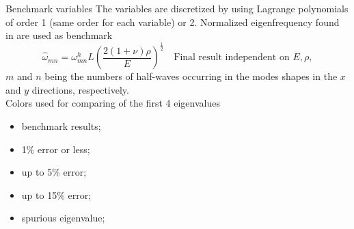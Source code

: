\documentclass{beamer}
\begin{document}
\begin{frame}{Benchmark variables}
	The variables are discretized by using Lagrange polynomials of order 1 (same order for each variable) or 2. Normalized eigenfrequency found in \cite{dawe1980rayleigh}  are used as benchmark 
	\[\widehat{\omega}_{mn} = \omega_{mn}^h L\left(\frac{2(1 + \nu)\rho}{E}\right)^{\frac{1}{2}} \quad \text{Final result independent on $E, \rho$},
	\]
	$m$ and $n$ being the numbers of half-waves occurring in the modes shapes in the $x$
	and $y$ directions, respectively. \\
	Colors used for comparing of the first 4 eigenvalues 
	\begin{itemize}
		\item {} benchmark results;
		\item {} 1\% error or less;
		\item {} up to 5\% error;		
		\item {} up to 15\% error;	
		\item {} spurious eigenvalue;	
	\end{itemize} 
	
	
	
\end{frame}
\end{document}
